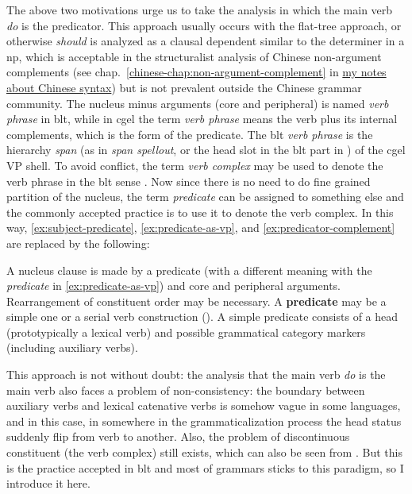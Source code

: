 \documentclass[UTF8, a4paper, oneside, scheme=plain]{ctexart}
\newcommand*{\citechap}[1]{chap.~{#1}}
\newcommand*{\concept}[1]{\textbf{#1}}
\newcommand*{\term}[1]{\emph{#1}}
\newcommand*{\corpus}[1]{\emph{#1}}
\newcommand{\chinesenote}{\href{../Chinese/main.pdf}{my notes about Chinese syntax}}
\begin{document}
The above two motivations urge us to take 
the analysis in which the main verb \corpus{do} is the predicator.
This approach usually occurs with the flat-tree approach,
or otherwise \corpus{should} is analyzed as a clausal dependent similar to the determiner in a \ac{np},
which is acceptable in the structuralist analysis of Chinese non-argument complements 
(see \citechap{\ref{chinese-chap:non-argument-complement}} in \chinesenote)
but is not prevalent outside the Chinese grammar community.
The nucleus minus arguments (core and peripheral) is named \term{verb phrase} in \ac{blt},
while in \ac{cgel} the term \term{verb phrase} means the verb plus its internal complements,
which is the form of the predicate.
The \ac{blt} \term{verb phrase} is the hierarchy \emph{span} 
(as in \term{span spellout}, or the head slot in the \ac{blt} part in ) 
of the \ac{cgel} VP shell.
To avoid conflict, 
the term \term{verb complex} may be used to denote the verb phrase in the \ac{blt} sense
\citep{hockett1948potawatomi,Friesen2017,Wilbur2014}.
Now since there is no need to do fine grained partition of the nucleus,
the term \term{predicate} can be assigned to something else 
and the commonly accepted practice is to use it to denote the verb complex.
In this way, \eqref{ex:subject-predicate}, \eqref{ex:predicate-as-vp}, and \eqref{ex:predicator-complement}
are replaced by the following:
\begin{exe}
    \ex A nucleus clause is made by a predicate
    (with a different meaning with the \term{predicate} in \eqref{ex:predicate-as-vp}) 
    and core and peripheral arguments.
    Rearrangement of constituent order may be necessary.
    \ex A \concept{predicate} may be a simple one or a serial verb construction 
    ().
    \ex A simple predicate consists of a head (prototypically a lexical verb) and  
    possible grammatical category markers (including auxiliary verbs). 
\end{exe}

This approach is not without doubt: the analysis that the main verb \corpus{do} is the main verb 
also faces a problem of non-consistency:
the boundary between auxiliary verbs and lexical catenative verbs %
is somehow vague in some languages, 
and in this case, in somewhere in the grammaticalization process the head status 
suddenly flip from verb to another.
Also, the problem of discontinuous constituent (the verb complex)
still exists, which can also be seen from .
But this is the practice accepted in \ac{blt} and most of grammars sticks to this paradigm,
so I introduce it here.
\end{document}
